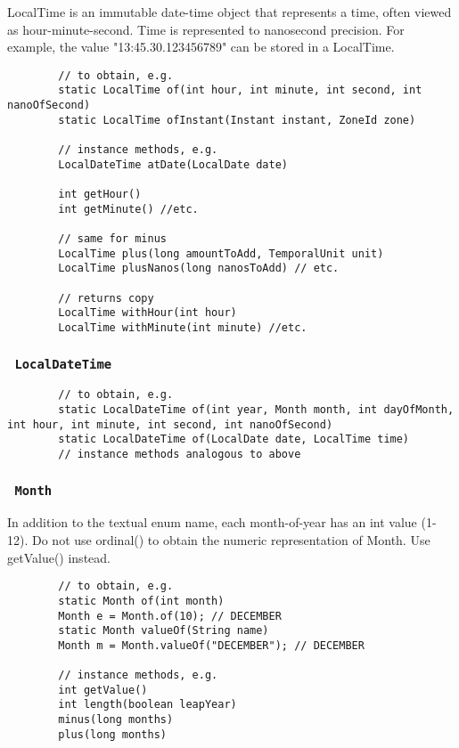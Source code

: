 \documentclass{scrartcl}
\begin{document}
    LocalTime is an immutable date-time object that represents a time, often viewed as hour-minute-second. Time is represented to nanosecond precision. For example, the value "13:45.30.123456789" can be stored in a LocalTime.

    \begin{lstlisting}
        // to obtain, e.g.
        static LocalTime of(int hour, int minute, int second, int nanoOfSecond)
        static LocalTime ofInstant(Instant instant, ZoneId zone)

        // instance methods, e.g.
        LocalDateTime atDate(LocalDate date)

        int getHour()
        int getMinute() //etc.

        // same for minus
        LocalTime plus(long amountToAdd, TemporalUnit unit)
        LocalTime plusNanos(long nanosToAdd) // etc.

        // returns copy
        LocalTime withHour(int hour)
        LocalTime withMinute(int minute) //etc.
        \end{lstlisting}

\subsubsection{\lstinline$ LocalDateTime $}

    \begin{lstlisting}
        // to obtain, e.g.
        static LocalDateTime of(int year, Month month, int dayOfMonth, int hour, int minute, int second, int nanoOfSecond)
        static LocalDateTime of(LocalDate date, LocalTime time)
        // instance methods analogous to above
    \end{lstlisting}

\subsubsection{\lstinline$ Month $}

    In addition to the textual enum name, each month-of-year has an int value (1-12).
    Do not use ordinal() to obtain the numeric representation of Month. Use getValue() instead.

    \begin{lstlisting}
        // to obtain, e.g.
        static Month of(int month)
        Month e = Month.of(10); // DECEMBER
        static Month valueOf(String name)
        Month m = Month.valueOf("DECEMBER"); // DECEMBER

        // instance methods, e.g.
        int getValue()
        int length(boolean leapYear)
        minus(long months)
        plus(long months)
    \end{lstlisting}
\end{document}
